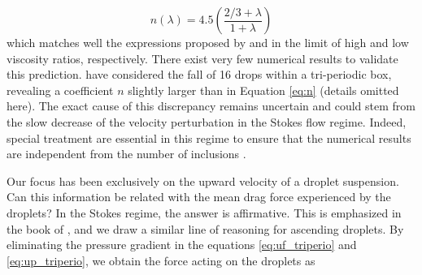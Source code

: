 

\begin{equation}
n(\lambda) = 4.5\left(\frac{2/3+\lambda}{1+\lambda}\right)
\label{eq:n}
\end{equation} 
which matches well the expressions proposed by \citet{brzinski2018} and \citet{ishii1979drag} in the limit of high and low viscosity ratios, respectively. There exist very few numerical results to validate this prediction. \citet{mo1994} have considered the fall of 16 drops within a tri-periodic box, revealing a coefficient $n$ slightly larger than in Equation \ref{eq:n} (details omitted here). The exact cause of this discrepancy remains uncertain and could stem from the slow decrease of the velocity perturbation in the Stokes flow regime. Indeed, special treatment are essential in this regime to ensure that the numerical results are independent from the number of inclusions \citet{mo1994}.

Our focus has been exclusively on the upward velocity of a droplet suspension. Can this information be related with the mean drag force experienced by the droplets? In the Stokes regime, the answer is affirmative. This is emphasized in the book of \citep{jackson2000}, and we draw a similar line of reasoning for ascending droplets. By eliminating the pressure gradient in the equations \ref{eq:uf_triperio} and \ref{eq:up_triperio}, we obtain the force acting on the droplets as

